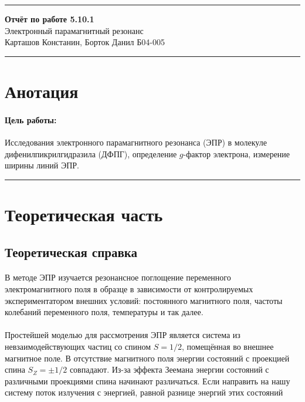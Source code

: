 \documentclass[a4paper,12pt]{article} %
\begin{document}


\hrule 	
\medskip
\begin{raggedright}
{\large \textbf{Отчёт по работе 5.10.1}}
\\
\medskip
{\Large Электронный парамагнитный резонанс} 
\\
\medskip
{\large Карташов Констанин, Борток Данил Б04-005}
\medskip
\hrule
\medskip
\end{raggedright}


\section{Анотация}

\paragraph{Цель работы:} 
Исследования электронного парамагнитного резонанса (ЭПР) в молекуле дифенилпикрилгидразила (ДФПГ), определение $g$-фактор электрона, измерение ширины линий ЭПР.



\medskip\hrule\medskip

\section{Теоретическая часть}

\subsection{Теоретическая справка}

\paragraph{}В методе ЭПР изучается резонансное поглощение переменного электромагнитного поля в образце в зависимости от контролируемых экспериментатором внешних условий: постоянного магнитного поля, частоты колебаний переменного поля, температуры и так далее.

\paragraph{}Простейшей моделью для рассмотрения ЭПР является система из невзаимодействующих частиц со спином $S = 1/2$, помещённая во внешнее магнитное поле. В отсутствие магнитного поля энергии состояний с проекцией спина $S_Z = \pm 1/2$ совпадают. Из-за эффекта Зеемана энергии состояний с различными проекциями спина начинают различаться. Если направить на нашу систему поток излучения с энергией, равной разнице энергий этих состояний 
\end{document}
